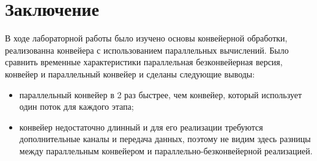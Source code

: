 \chapter*{Заключение}

В ходе лабораторной работы было изучено основы конвейерной обработки,
реализованна конвейера с использованием параллельных вычислений.
Было сравнить временные характеристики параллельная безконвейерная версия,
конвейер и параллельный конвейер
и сделаны следующие выводы:

\begin{itemize}
    \item параллельный конвейер в 2 раз быстрее, чем конвейер,
    который использует один поток для каждого этапа;
    \item конвейер недостаточно длинный и для его реализации требуются дополнительные каналы и передача данных,
    поэтому не видим здесь разницы между параллельным конвейером и параллельно-безконвейерной реализацией.
\end{itemize}
